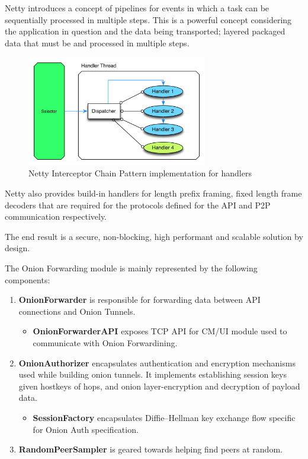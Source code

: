 \documentclass{article}
\begin{document}
Netty introduces a concept of pipelines for events in which a task can be sequentially processed in multiple steps. This is a powerful concept considering the application in question and the data being transported; layered packaged data that must be and processed in multiple steps.

\begin{figure}[H]
\centering
     \includegraphics[width=0.7\textwidth]{netty-handlers-chain.png}
      \caption{Netty Interceptor Chain Pattern implementation for handlers \cite{netty}}
\end{figure}

Netty also provides build-in handlers for length prefix framing, fixed length frame decoders that are required for the protocols defined for the API and P2P communication respectively. 

The end result is a secure, non-blocking, high performant and scalable solution by design.

The Onion Forwarding module is mainly represented by the following components:

\begin{enumerate}
  \item \textbf{OnionForwarder} is responsible for forwarding data between API connections and Onion Tunnels.
  \begin{itemize}
    \item \textbf{OnionForwarderAPI} exposes TCP API for CM/UI module used to communicate with Onion Forwardining.
  \end{itemize}
  \item \textbf{OnionAuthorizer} encapsulates authentication and encryption mechanisms used while building onion tunnels. It implements establishing session keys given hostkeys of hops, and onion layer-encryption and decryption of payload data.
  \begin{itemize}
    \item \textbf{SessionFactory} encapsulates Diffie–Hellman key exchange flow specific for Onion Auth specification.
  \end{itemize}
  \item \textbf{RandomPeerSampler} is geared towards helping find peers at random.
\end{enumerate}
\end{document}
